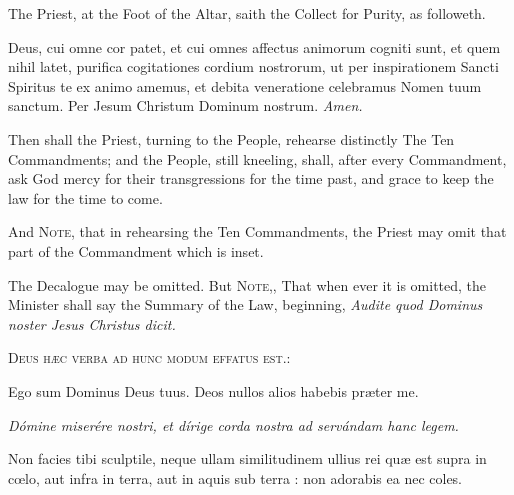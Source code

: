 \fancyhead[RO,LE]{}
\fancyhead[RE,LO]{}
{}

\begin{rubric}
    The Priest, at the Foot of the Altar, saith the Collect for Purity, as followeth.
\end{rubric}
 Deus, cui omne cor patet, et cui omnes affectus animorum cogniti sunt, et quem nihil latet, purifica cogitationes cordium nostrorum, ut per inspirationem Sancti Spiritus te ex animo amemus, et debita veneratione celebramus Nomen tuum sanctum. Per Jesum Christum Dominum nostrum. \textit{Amen.}
\begin{rubric}
Then shall the Priest, turning to the People, rehearse distinctly The Ten Commandments; and the People, still kneeling, shall, after every Commandment, ask God mercy for their transgressions for the time past, and grace to keep the law for the time to come.
\end{rubric}
\begin{rubric}
And \textsc{Note,} that in rehearsing the Ten Commandments, the Priest may omit that part of the Commandment which is inset.
\end{rubric}
\begin{rubric}
	The Decalogue may be omitted. But \textsc{Note,}, That when ever it is omitted, the Minister shall say the Summary of the Law, beginning, \emph{Audite quod Dominus noster Jesus Christus dicit.}
\end{rubric}
\vspace{-1ex}
\begin{center}
	\textsc{Deus h{\ae}c verba ad hunc modum effatus est.:}
\end{center}
\par\noindent
    Ego sum Dominus Deus tuus. Deos nullos alios habebis pr{\ae}ter me.\par
    \textit{Dómine miserére nostri, et dírige corda nostra ad servándam hanc legem.}
    \par\noindent
    Non facies tibi sculptile, neque ullam similitudinem ullius rei quæ est supra in cœlo, aut infra in terra, aut in aquis sub terra : non adorabis ea nec coles. 
